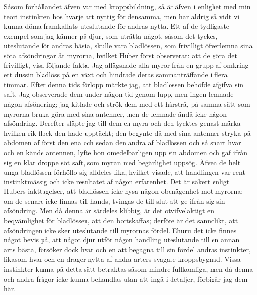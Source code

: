 Såsom förhållandet äfven var med kroppsbildning, så är äfven i enlighet med min teori instinkten hos hvarje art nyttig för densamma, men har aldrig så vidt vi kunna döma framkallats uteslutande för andras nytta. Ett af de tydligaste exempel som jag känner på djur, som uträtta något, såsom det tyckes, uteslutande för andras bästa, skulle vara bladlössen, som frivilligt öfverlemna sina söta afsöndringar åt myrorna, hvilket Huber först observerat; att de göra det frivilligt, visa följande fakta. Jag aflägsnade alla myror från en grupp af omkring ett dussin bladlöss på en växt och hindrade deras sammanträffande i flera timmar. Efter denna tids förlopp märkte jag, att bladlössen behöfde afgifva sin saft. Jag observerade dem under någon tid genom lupp, men ingen lemnade någon afsöndring; jag kitlade och strök dem med ett hårstrå, på samma sätt som myrorna bruka göra med sina antenner, men de lemnade ändå icke någon afsöndring. Derefter släpte jag till dem en myra och den tycktes genast märka hvilken rik flock den hade upptäckt; den begynte då med sina antenner stryka på abdomen af först den ena och sedan den andra af bladlössen och så snart hvar och en kände antennen, lyfte hon omedelbarligen upp sin abdomen och gaf ifrån sig en klar droppe söt saft, som myran med begärlighet uppsög. Äfven de helt unga bladlössen förhöllo sig alldeles lika, hvilket visade, att handlingen var rent instinktmässig och icke resultatet af någon erfarenhet. Det är säkert enligt Hubers iakttagelser, att bladlössen icke hysa någon obenägenhet mot myrorna; om de senare icke finnas till hands, tvingas de till slut att ge ifrån sig sin afsöndring. Men då denna är särdeles klibbig, är det otvifvelaktigt en beqvämlighet för bladlössen, att den bortskaffas; derföre är det sannolikt, att afsöndringen icke sker uteslutande till myrornas fördel. Ehuru det icke finnes något bevis på, att något djur utför någon handling uteslutande till en annan arts bästa, försöker dock hvar och en att begagna till sin fördel andras instinkter, likasom hvar och en drager nytta af andra arters svagare kroppsbygnad. Vissa instinkter kunna på detta sätt betraktas såsom mindre fullkomliga, men då denna och andra frågor icke kunna behandlas utan att ingå i detaljer, förbigår jag dem här.

